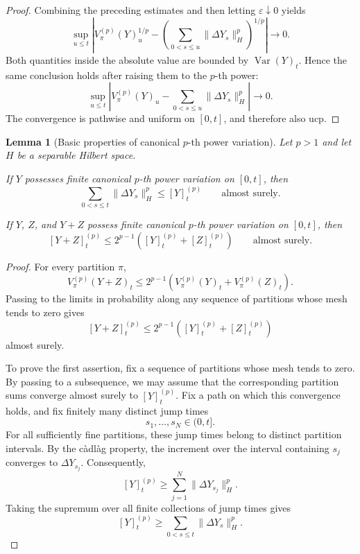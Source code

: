 \documentclass[a4paper,10pt]{article}
\newtheorem{lemma}[thm]{Lemma}
\begin{document}
\begin{proof}
Combining the preceding estimates and then letting
\(\varepsilon\downarrow0\) yields
\[
\sup_{u\le t}
\left|
V_\pi^{(p)}(Y)_u^{1/p}
-
\left(
\sum_{0<s\le u}
\lVert\Delta Y_s\rVert_H^p
\right)^{1/p}
\right|
\longrightarrow0.
\]
Both quantities inside the absolute value are bounded by
\(\operatorname{Var}(Y)_t\). Hence the same conclusion holds after
raising them to the \(p\)-th power:
\[
\sup_{u\le t}
\left|
V_\pi^{(p)}(Y)_u
-
\sum_{0<s\le u}
\lVert\Delta Y_s\rVert_H^p
\right|
\longrightarrow0.
\]
The convergence is pathwise and uniform on \([0,t]\), and therefore
also ucp.
\end{proof}

\begin{lemma}[Basic properties of canonical \(p\)-th power variation]
\label{lem:canonical-p-power-basic}
Let \(p>1\) and let \(H\) be a separable Hilbert space.

If \(Y\) possesses finite canonical \(p\)-th power variation on
\([0,t]\), then
\[
\sum_{0<s\le t}
\lVert\Delta Y_s\rVert_H^p
\le
[Y]^{(p)}_t
\qquad\text{almost surely}.
\]

If \(Y\), \(Z\), and \(Y+Z\) possess finite canonical \(p\)-th power
variation on \([0,t]\), then
\[
[Y+Z]^{(p)}_t
\le
2^{p-1}
\left(
[Y]^{(p)}_t+[Z]^{(p)}_t
\right)
\qquad\text{almost surely}.
\]
\end{lemma}

\begin{proof}
For every partition \(\pi\),
\[
V_\pi^{(p)}(Y+Z)_t
\le
2^{p-1}
\left(
V_\pi^{(p)}(Y)_t+V_\pi^{(p)}(Z)_t
\right).
\]
Passing to the limits in probability along any sequence of partitions
whose mesh tends to zero gives
\[
[Y+Z]^{(p)}_t
\le
2^{p-1}
\left(
[Y]^{(p)}_t+[Z]^{(p)}_t
\right)
\]
almost surely.

To prove the first assertion, fix a sequence of partitions whose mesh
tends to zero. By passing to a subsequence, we may assume that the
corresponding partition sums converge almost surely to
\([Y]^{(p)}_t\). Fix a path on which this convergence holds, and fix
finitely many distinct jump times
\[
        s_1,\ldots,s_N\in(0,t].
\]
For all sufficiently fine partitions, these jump times belong to
distinct partition intervals. By the càdlàg property, the increment
over the interval containing \(s_j\) converges to \(\Delta Y_{s_j}\).
Consequently,
\[
[Y]^{(p)}_t
\ge
\sum_{j=1}^N
\lVert\Delta Y_{s_j}\rVert_H^p.
\]
Taking the supremum over all finite collections of jump times gives
\[
[Y]^{(p)}_t
\ge
\sum_{0<s\le t}
\lVert\Delta Y_s\rVert_H^p.
\]
\end{proof}
\end{document}
